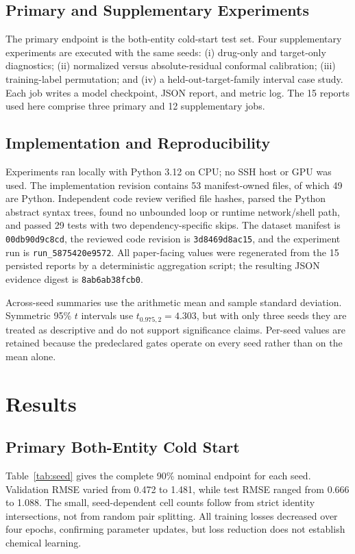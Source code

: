 \documentclass[lettersize,journal]{IEEEtran}
\begin{document}
\subsection{Primary and Supplementary Experiments}
The primary endpoint is the both-entity cold-start test set. Four supplementary experiments are executed with the same seeds: (i) drug-only and target-only diagnostics; (ii) normalized versus absolute-residual conformal calibration; (iii) training-label permutation; and (iv) a held-out-target-family interval case study. Each job writes a model checkpoint, JSON report, and metric log. The 15 reports used here comprise three primary and 12 supplementary jobs.

\subsection{Implementation and Reproducibility}
Experiments ran locally with Python 3.12 on CPU; no SSH host or GPU was used. The implementation revision contains 53 manifest-owned files, of which 49 are Python. Independent code review verified file hashes, parsed the Python abstract syntax trees, found no unbounded loop or runtime network/shell path, and passed 29 tests with two dependency-specific skips. The dataset manifest is \texttt{00db90d9c8cd}, the reviewed code revision is \texttt{3d8469d8ac15}, and the experiment run is \texttt{run\_5875420e9572}. All paper-facing values were regenerated from the 15 persisted reports by a deterministic aggregation script; the resulting JSON evidence digest is \texttt{8ab6ab38fcb0}.

Across-seed summaries use the arithmetic mean and sample standard deviation. Symmetric 95\% $t$ intervals use $t_{0.975,2}=4.303$, but with only three seeds they are treated as descriptive and do not support significance claims. Per-seed values are retained because the predeclared gates operate on every seed rather than on the mean alone.

\section{Results}

\subsection{Primary Both-Entity Cold Start}
\label{sec:primary}
Table~\ref{tab:seed} gives the complete 90\% nominal endpoint for each seed. Validation RMSE varied from 0.472 to 1.481, while test RMSE ranged from 0.666 to 1.088. The small, seed-dependent cell counts follow from strict identity intersections, not from random pair splitting. All training losses decreased over four epochs, confirming parameter updates, but loss reduction does not establish chemical learning.
\end{document}
